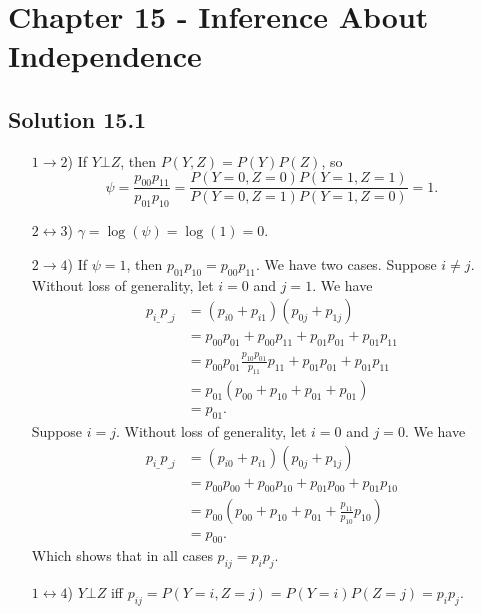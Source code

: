 \section*{Chapter 15 - Inference About Independence}

\subsection*{Solution 15.1}

\begin{itemize}
    \item[$1 \rightarrow 2$)] If $Y \bot Z$, then $P(Y, Z) = P(Y)P(Z)$, so
        \begin{equation*}
            \psi = \frac{p_{00}p_{11}}{p_{01}p_{10}}
                = \frac{P(Y=0,Z=0)P(Y=1,Z=1)}{P(Y=0,Z=1)P(Y=1,Z=0)}
                = 1.
        \end{equation*}
    \item[$2 \leftrightarrow 3$)] $\gamma = \log(\psi) = \log(1) = 0$.
    \item[$2 \rightarrow 4$)] If $\psi = 1$, then $p_{01}p_{10} = p_{00}p_{11}$.
        We have two cases.
        Suppose $i \neq j$.
        Without loss of generality, let $i = 0$ and $j = 1$.
        We have
        \begin{equation*}
            \begin{split}
                p_{i\_} p_{\_j}
                    &= (p_{i0} + p_{i1})(p_{0j} + p_{1j}) \\
                    &= p_{00}p_{01} + p_{00}p_{11} + p_{01}p_{01} + p_{01}p_{11} \\
                    &= p_{00}p_{01} \frac{p_{10}p_{01}}{p_{11}}p_{11} + p_{01}p_{01} + p_{01}p_{11} \\
                    &= p_{01}(p_{00} + p_{10} + p_{01} + p_{01}) \\
                    &= p_{01}.
            \end{split}
        \end{equation*}
        Suppose $i = j$.
        Without loss of generality, let $i = 0$ and $j = 0$.
        We have
        \begin{equation*}
            \begin{split}
                p_{i\_} p_{\_j}
                    &= (p_{i0} + p_{i1})(p_{0j} + p_{1j}) \\
                    &= p_{00}p_{00} + p_{00}p_{10} + p_{01}p_{00} + p_{01}p_{10} \\
                    &= p_{00}(p_{00} + p_{10} + p_{01} + \frac{p_{11}}{p_{10}} p_{10}) \\
                    &= p_{00}.
            \end{split}
        \end{equation*}
        Which shows that in all cases $p_{ij} = p_ip_j$.
    \item[$1 \leftrightarrow 4$)] $Y \bot Z$ iff $p_{ij} = P(Y=i,Z=j) = P(Y=i)P(Z=j) = p_ip_j$.
\end{itemize}
